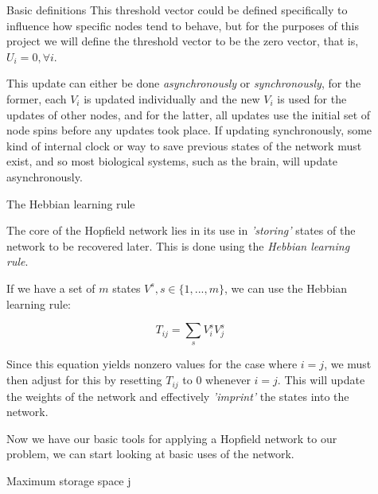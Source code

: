 \documentclass[25pt, a0paper, portrait]{beamer}
\newlength{\sepwidth}
\newlength{\colwidth}
\newcommand{\separatorcolumn}{\begin{column}{\sepwidth}\end{column}}
\begin{document}
\begin{frame}[t]
\begin{columns}[t]
\begin{column}{\colwidth}
\begin{block}{Basic definitions}
    This threshold vector could be defined specifically to influence how specific nodes
    tend to behave, but for the purposes of this project we will define the threshold
    vector to be the zero vector, that is, $U_i = 0, \forall i$.

    This update can either be done \textit{asynchronously} or \textit{synchronously}, for the former,
    each $V_i$ is updated individually and the new $V_i$ is used for the updates
    of other nodes, and for the latter, all updates use the initial set of node spins
    before any updates took place. If updating synchronously, some kind of internal
    clock or way to save previous states of the network must exist, and so most 
    biological systems, such as the brain, will update asynchronously.
  \end{block}

  \begin{alertblock}{The Hebbian learning rule} \small

    The core of the Hopfield network lies in its use in \textit{'storing'} states
    of the network to be recovered later. This is done using the \textit{Hebbian learning
    rule}. \cite{hopfield:1982}

    If we have a set of $m$ states $V^s, s \in \{1, ..., m\}$, we can use the
    Hebbian learning rule:

    \begin{equation} \label{hebbian_learning_rule}
      T_{ij} = \sum_{s}{V^s_i}{V^s_j}
    \end{equation}

    Since this equation yields nonzero values for the case where $i = j$, we must
    then adjust for this by resetting $T_{ij}$ to $0$ whenever $i = j$. This will 
    update the weights of the network and effectively \textit{'imprint'}
    the states into the network.

    Now we have our basic tools for applying a Hopfield network to our problem, we
    can start looking at basic uses of the network.
  \end{alertblock}

  \begin{block}{Maximum storage space} \small
    j \cite{fncom:2017}
  \end{block}

\end{column}

\separatorcolumn

\begin{column}{\colwidth}


\end{column}
\end{columns}
\end{frame}
\end{document}
